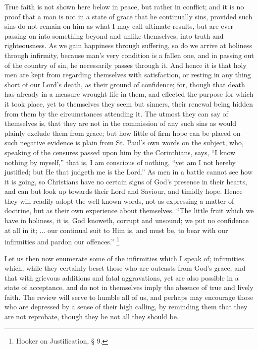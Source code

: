 True faith is not shown here below in peace, but rather in
conflict; and it is no proof that a man is not in a state of grace
that he continually sins, provided such sins do not remain on him as
what I may call ultimate results, but are ever passing on into
something beyond and unlike themselves, into truth and righteousness.
As we gain happiness through suffering, so do we arrive at holiness
through infirmity, because man's very condition is a fallen one, and
in passing out of the country of sin, he necessarily passes through
it. And hence it is that holy men are kept from regarding themselves
with satisfaction, or resting in any thing short of our Lord's death,
as their ground of confidence; for, though that death has already in a
measure wrought life in them, and effected the purpose for which it
took place, yet to themselves they seem but sinners, their renewal
being hidden from them by the circumstances attending it. The utmost
they can say of themselves is, that they are not in the commission of
any such sins as would plainly exclude them from grace; but how little
of firm hope can be placed on such negative evidence is plain from St.
Paul's own words on the subject, who, speaking of the censures passed
upon him by the Corinthians, says, ``I know nothing by
myself,'' that is, I am conscious of nothing, ``yet am I not
hereby justified; but He that judgeth me is the Lord.'' As men in
a battle cannot see how it is going, so Christians have no certain
signs of God's presence in their hearts, and can but look up towards
their Lord and Saviour, and timidly hope. Hence they will readily
adopt the well-known words, not as expressing a matter of doctrine,
but as their own experience about themselves. ``The little fruit
which we have in holiness, it is, God knoweth, corrupt and unsound; we
put no confidence at all in it; ... our continual suit to Him is, and
must be, to bear with our infirmities and pardon our offences.'' \footnote{Hooker on Justification, § 9.}

Let us then now enumerate some of the infirmities which I speak of;
infirmities which, while they certainly beset those who are outcasts
from God's grace, and that with grievous additions and fatal
aggravations, yet are also possible in a state of acceptance, and do
not in themselves imply the absence of true and lively faith. The
review will serve to humble all of us, and perhaps may encourage those
who are depressed by a sense of their high calling, by reminding them
that they are not reprobate, though they be not all they should be.

